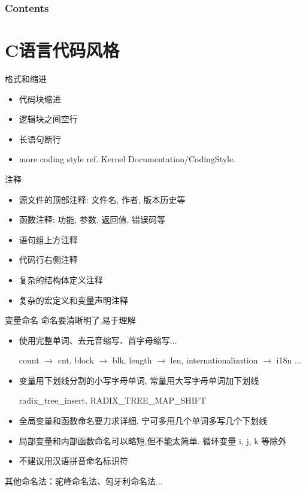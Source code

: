 \documentclass[10pt,t]{beamer}
\begin{document}
\begin{frame}
  \maketitle
\end{frame}

\begin{frame}\frametitle<presentation>{Contents}
  \tableofcontents

\end{frame}

\section{C语言代码风格}
\begin{frame}{格式和缩进}
\begin{itemize}
    \item 代码块缩进
    \item 逻辑块之间空行
    \item 长语句断行

    \item more coding style ref. Kernel \alert{Documentation/CodingStyle}.
\end{itemize}
\end{frame}

\begin{frame}{注释}
\begin{itemize}
    \item 源文件的顶部注释: 文件名, 作者, 版本历史等
    \item 函数注释: 功能, 参数, 返回值, 错误码等
    \item 语句组上方注释
    \item 代码行右侧注释
    \item 复杂的结构体定义注释
    \item 复杂的宏定义和变量声明注释
\end{itemize}
\end{frame}

\begin{frame}{变量命名}
命名要清晰明了,易于理解
\begin{itemize}
    \item 使用完整单词、去元音缩写、首字母缩写...

        \alert{count} $\to$ \alert{cnt}, \alert{block} $\to$ \alert{blk},
        \alert{length} $\to$ \alert{len},
        \alert{internationalization} $\to$ \alert{i18n} ...
    \item 变量用下划线分割的小写字母单词, 常量用大写字母单词加下划线

        \alert{radix\_tree\_insert}, \alert{RADIX\_TREE\_MAP\_SHIFT}
    \item 全局变量和函数命名要力求详细, 宁可多用几个单词多写几个下划线

    \item 局部变量和内部函数命名可以略短,但不能太简单.
        循环变量 \alert{i}, \alert{j}, \alert{k} 等除外
    \item 不建议用汉语拼音命名标识符

\end{itemize}
    其他命名法：驼峰命名法、匈牙利命名法...
\end{frame}
\end{document}
